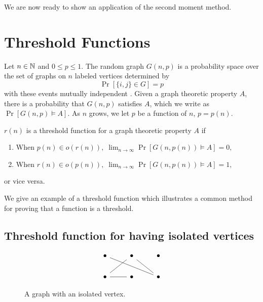 We are now ready to show an application of the second moment method. \par
\section{Threshold Functions}\label{sec:probmet:threshold}

Let $n \in \mathbb{N}$ and $0 \leq p \leq 1$. The random graph $G(n, p)$ is a probability space over the set of graphs on $n$ labeled vertices determined by
\[\Pr[\{i, j\} \in G] = p\] 
with these events mutually independent \cite{alon2016probabilistic}. Given a graph theoretic property $A$, there is a probability that $G(n, p)$ satisfies $A$, which we write as $\Pr[G(n, p) \vDash A]$. As $n$ grows, we let $p$ be a function of $n$, $p = p(n)$. \par

\begin{definition}\label{def:probmet:threshold}
    $r(n)$ is a threshold function for a graph theoretic property $A$ if 
    \begin{enumerate}
        \item When \(p(n) \in o(r(n)), \; \lim_{n \to \infty} \Pr[G(n, p(n)) \vDash A] = 0,\)
        \item When \(r(n) \in o(p(n)), \;  \lim_{n \to \infty} \Pr[G(n, p(n)) \vDash A] = 1,\) 
    \end{enumerate}
    or vice versa. \cite{alon2016probabilistic}
\end{definition}

We give an example of a threshold function which illustrates a common method for proving that a function is a threshold. \par

\subsection{Threshold function for having isolated vertices}

\begin{figure}[h]
    \[\begin{tikzcd}
        \bullet & \bullet & \bullet \\
        \bullet & \bullet & \bullet
        \arrow[no head, from=2-1, to=1-2]
        \arrow[no head, from=2-1, to=2-2]
        \arrow[no head, from=1-2, to=2-3]
        \arrow[no head, from=2-3, to=1-1]
    \end{tikzcd}\]
    \caption{A graph with an isolated vertex.}
    \label{fig:isolatedvertex}
\end{figure}

